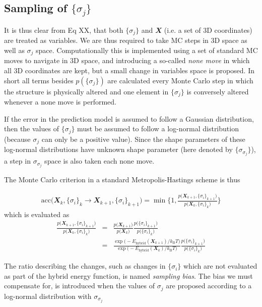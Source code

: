 \subsection{Sampling of $\{\sigma_j\}$}
It is thus clear from Eq XX, that both $\{\sigma_j\}$ and $\mathbfit X$ (i.e. a set of 3D coordinates) are treated as variables. We are thus required to take MC steps in 3D space as well as $\sigma_j$ space. Computationally this is implemented using a set of standard MC moves to navigate in 3D space, and introducing a so-called \textit{none move} in which all 3D coordinates are kept, but a small change in variables space is proposed. In short all terms besides $p\left(\{\sigma_j\} \right)$ are calculated every Monte Carlo step in which the structure is physically altered and one element in $\{\sigma_j\}$ is conversely altered whenever a none move is performed.

If the error in the prediction model is assumed to follow a Gaussian distribution, then the values of $\{\sigma_j\}$ must be assumed to follow a log-normal distribution (because $\sigma_j$ can only be a positive value). Since the shape parameters of these log-normal distributions have unknown shape parameter (here denoted by $\{\sigma_{\sigma_j}\}$), a step in $\sigma_{\sigma_j}$ space is also taken each none move.

The Monte Carlo criterion in a standard Metropolis-Hastings scheme is thus

\begin{align}
\mathrm{acc}\Big(\mathbfit{X}_k, \{\sigma_i\}_k  \to \mathbfit{X}_{k+1}, \{\sigma_i\}_{k+1}\Big) = \min \Biggl\{1, \frac{p\Big(\mathbfit{X}_{k+1}, \{\sigma_i\}_{k+1}\Big)}{p\Big( \mathbfit{X}_k, \{\sigma_i\}_k\Big)} \Biggr\}
\end{align}
which is evaluated as
\begin{eqnarray}
\frac{p\Big(\mathbfit{X}_{k+1}, \{\sigma_i\}_{k+1}\Big)}{p\Big( \mathbfit{X}_k, \{\sigma_i\}_k\Big)} & = & \frac{p\Big(\mathbfit{X}_{k+1} \Big)}{p\Big( \mathbfit{X}_k\Big)} \frac{p\Big( \{\sigma_i\}_{k+1}\Big)}{p\Big( \{\sigma_i\}_k\Big)}\\
 &=& \frac{\exp{\Big(- E_{\mathrm{hybrid}}\left(\mathbfit{X}_{k+1}\right)/k_\mathrm{B}}T\Big)}{\exp{\Big(- E_{\mathrm{hybrid}}\left(\mathbfit{X}_{k}\right)/k_\mathrm{B}}T\Big)}\frac{p\Big( \{\sigma_i\}_{k+1}\Big)}{p\Big( \{\sigma_i\}_k\Big)}
\end{eqnarray}

The ratio describing the changes, such as changes in $\{\sigma_i\}$ which are not evaluated as part of the hybrid energy function, is named \textit{sampling bias}. The bias we must compensate for, is introduced when the values of $\sigma_j$ are proposed according to a log-normal distribution with  $\sigma_{\sigma_j}$ 

